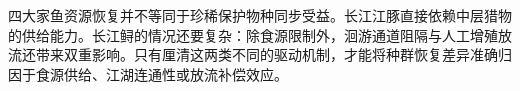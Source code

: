 四大家鱼资源恢复并不等同于珍稀保护物种同步受益。长江江豚直接依赖中层猎物的供给能力。长江鲟的情况还要复杂：除食源限制外，洄游通道阻隔与人工增殖放流还带来双重影响。只有厘清这两类不同的驱动机制，才能将种群恢复差异准确归因于食源供给、江湖连通性或放流补偿效应。
